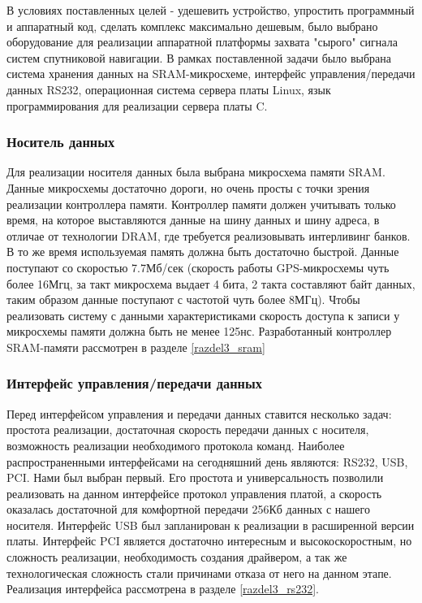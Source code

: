В условиях поставленных целей - удешевить устройство, упростить программный и аппаратный код, сделать комплекс максимально дешевым, было
выбрано оборудование для реализации аппаратной платформы захвата "сырого" сигнала систем спутниковой навигации. В рамках поставленной
задачи было выбрана система хранения данных на SRAM-микросхеме, интерфейс управления/передачи данных RS232, операционная система
сервера платы Linux, язык программирования для реализации сервера платы C.

\subsubsection{Носитель данных}
\label{razdel1_sram}
Для реализации носителя данных была выбрана микросхема памяти SRAM. Данные микросхемы достаточно дороги, но очень просты с точки зрения
реализации контроллера памяти. Контроллер памяти должен учитывать только время, на которое выставляются данные на шину данных и шину адреса,
в отличае от технологии DRAM, где требуется реализовывать интерливинг банков. В то же время используемая память должна быть достаточно
быстрой. Данные поступают со скоростью 7.7Мб/сек (скорость работы GPS-микросхемы чуть более 16Мгц, за такт микросхема выдает 4 бита, 2 такта
составляют байт данных, таким образом данные поступают с частотой чуть более 8МГц). Чтобы реализовать систему с данными характеристиками
скорость доступа к записи у микросхемы памяти должна быть не менее 125нс. Разработанный контроллер SRAM-памяти рассмотрен в разделе
\ref{razdel3_sram}

\subsubsection{Интерфейс управления/передачи данных}
\label{razdel1_rs232}
Перед интерфейсом управления и передачи данных ставится несколько задач: простота реализации, достаточная скорость передачи данных с
носителя, возможность реализации необходимого протокола команд. Наиболее распространенными интерфейсами на сегодняшний день
являются: RS232, USB, PCI. Нами был выбран первый. Его простота и универсальность позволили реализовать на данном интерфейсе протокол
управления платой, а скорость оказалась достаточной для комфортной передачи 256Кб данных с нашего носителя. Интерфейс USB был запланирован
к реализации в расширенной версии платы. Интерфейс PCI является достаточно интересным и высокоскоростным, но сложность реализации,
необходимость создания драйвером, а так же технологическая сложность стали причинами отказа от него на данном этапе. Реализация 
интерфейса рассмотрена в разделе \ref{razdel3_rs232}.

